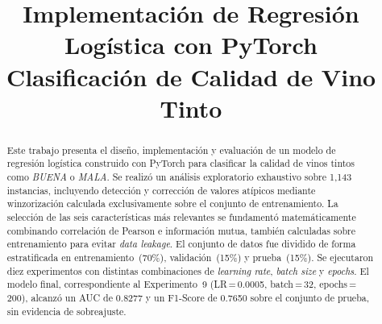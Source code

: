 \documentclass[conference]{IEEEtran}
\begin{document}
\title{Implementaci\'{o}n de Regresi\'{o}n Log\'{i}stica con PyTorch\\
{\large Clasificaci\'{o}n de Calidad de Vino Tinto}}

\author{
\and
{}
\and
{}
}

\maketitle

\begin{abstract}
Este trabajo presenta el dise\~{n}o, implementaci\'{o}n y evaluaci\'{o}n de un modelo de regresi\'{o}n log\'{i}stica construido con PyTorch para clasificar la calidad de vinos tintos como \textit{BUENA} o \textit{MALA}. Se realiz\'{o} un an\'{a}lisis exploratorio exhaustivo sobre 1{,}143 instancias, incluyendo detecci\'{o}n y correcci\'{o}n de valores at\'{i}picos mediante winzorizaci\'{o}n calculada exclusivamente sobre el conjunto de entrenamiento. La selecci\'{o}n de las seis caracter\'{i}sticas m\'{a}s relevantes se fundament\'{o} matem\'{a}ticamente combinando correlaci\'{o}n de Pearson e informaci\'{o}n mutua, tambi\'{e}n calculadas sobre entrenamiento para evitar \textit{data leakage}. El conjunto de datos fue dividido de forma estratificada en entrenamiento~(70\%), validaci\'{o}n~(15\%) y prueba~(15\%). Se ejecutaron diez experimentos con distintas combinaciones de \textit{learning rate}, \textit{batch size} y \textit{epochs}. El modelo final, correspondiente al Experimento~9 (LR\,=\,0.0005, batch\,=\,32, epochs\,=\,200), alcanz\'{o} un AUC de 0.8277 y un F1-Score de 0.7650 sobre el conjunto de prueba, sin evidencia de sobreajuste.
\end{abstract}
\end{document}
